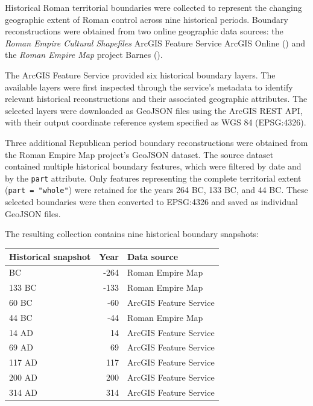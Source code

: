 \documentclass[
  letterpaper,
  DIV=11,
  numbers=noendperiod]{scrartcl}
\begin{document}
Historical Roman territorial boundaries were collected to represent the
changing geographic extent of Roman control across nine historical
periods. Boundary reconstructions were obtained from two online
geographic data sources: the \emph{Roman Empire Cultural Shapefiles}
ArcGIS Feature Service ArcGIS Online
() and the \emph{Roman Empire
Map} project Barnes ().

The ArcGIS Feature Service provided six historical boundary layers. The
available layers were first inspected through the service's metadata to
identify relevant historical reconstructions and their associated
geographic attributes. The selected layers were downloaded as GeoJSON
files using the ArcGIS REST API, with their output coordinate reference
system specified as WGS 84 (EPSG:4326).

Three additional Republican period boundary reconstructions were
obtained from the Roman Empire Map project's GeoJSON dataset. The source
dataset contained multiple historical boundary features, which were
filtered by date and by the \texttt{part} attribute. Only features
representing the complete territorial extent (\texttt{part\ =\ "whole"})
were retained for the years 264 BC, 133 BC, and 44 BC. These selected
boundaries were then converted to EPSG:4326 and saved as individual
GeoJSON files.

The resulting collection contains nine historical boundary snapshots:

\begin{longtable}[]{@{}lrl@{}}
\toprule\noalign{}
Historical snapshot & Year & Data source \\
\midrule\noalign{}
\endhead
\bottomrule\noalign{}
\endlastfoot
264 BC & -264 & Roman Empire Map \\
133 BC & -133 & Roman Empire Map \\
60 BC & -60 & ArcGIS Feature Service \\
44 BC & -44 & Roman Empire Map \\
14 AD & 14 & ArcGIS Feature Service \\
69 AD & 69 & ArcGIS Feature Service \\
117 AD & 117 & ArcGIS Feature Service \\
200 AD & 200 & ArcGIS Feature Service \\
314 AD & 314 & ArcGIS Feature Service \\
\end{longtable}
\end{document}
